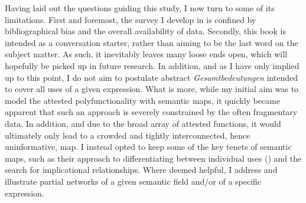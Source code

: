 Having laid out the questions guiding this study, I now turn to some of its limitations. First and foremost, the survey I develop in  is confined by bibliographical bias and the overall availability of data. Secondly, this book is intended as a conversation starter, rather than aiming to be the last word on the subject matter. As such, it inevitably leaves many loose ends open, which will hopefully be picked up in future research. In addition, and as I have only implied up to this point, I do not aim to postulate abstract \textit{Gesamtbedeutungen} intended to cover all uses of a given expression. What is more, while my initial aim was to model the attested polyfunctionality with semantic maps, it quickly became apparent that such an approach is severely constrained by the often fragmentary data. In addition, and due to the broad array of attested functions, it would ultimately only lead to a crowded and tightly interconnected, hence uninformative, map. I instead opted to keep some of the key tenets of semantic maps, such as their approach to differentiating between individual uses () and the search for implicational relationships. Where deemed helpful, I address and illustrate partial networks of a given semantic field and/or of a specific expression.

